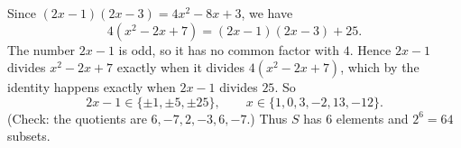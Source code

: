Since $(2x-1)(2x-3)=4x^2-8x+3$, we have
\[4\left(x^2-2x+7\right)=(2x-1)(2x-3)+25 .\]
The number $2x-1$ is odd, so it has no common factor with $4$. Hence $2x-1$ divides $x^2-2x+7$ exactly when it divides $4\left(x^2-2x+7\right)$, which by the identity happens exactly when $2x-1$ divides $25$. So
\[2x-1\in\{\pm1,\pm5,\pm25\},\qquad x\in\{1,0,3,-2,13,-12\}.\]
(Check: the quotients are $6,-7,2,-3,6,-7$.) Thus $S$ has $6$ elements and $2^6=\boxed{64}$ subsets.
